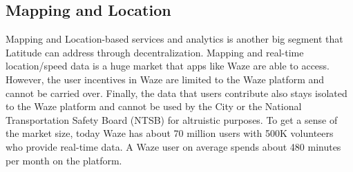 %
%
%
%
%
%
%
%


\noindent
\subsection{Mapping and Location}

Mapping and Location-based services and analytics is another big segment that Latitude can address through
decentralization. Mapping and real-time location/speed data is a huge market that apps like Waze are able to access.
However, the user incentives in Waze are limited to the Waze platform and cannot be carried over. Finally, the data that
users contribute also stays isolated to the Waze platform and cannot be used by the City or the National Transportation
Safety Board (NTSB) for altruistic purposes. To get a sense of the market size, today Waze has about 70 million users
with 500K volunteers who provide real-time data. A Waze user on average spends about 480 minutes per month on the
platform.

